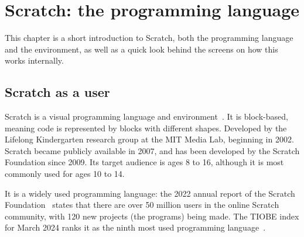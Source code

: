 \documentclass[../main]{subfiles}
\begin{document}
\chapter{Scratch: the programming language}\label{ch:scratch-the-programming-language}

This chapter is a short introduction to Scratch, both the programming language and the environment, as well as a quick look behind the screens on how this works internally.

\section{Scratch as a user}\label{sec:scratch-as-a-user}

Scratch is a visual programming language and environment~\autocite{resnickScratchProgrammingAll2009}.
It is block-based, meaning code is represented by blocks with different shapes.
Developed by the Lifelong Kindergarten research group at the MIT Media Lab, beginning in 2002.
Scratch became publicly available in 2007, and has been developed by the Scratch Foundation since 2009.
Its target audience is ages 8 to 16, although it is most commonly used for ages 10 to 14.

It is a widely used programming language: the 2022 annual report of the Scratch Foundation~\autocite{GrowingGlobalCreative2022} states that there are over 50 million users in the online Scratch community, with 120 new projects (the programs) being made.
The TIOBE index for March 2024 ranks it as the ninth most used programming language~\autocite{TIOBEIndexMarch2024}.
\end{document}
